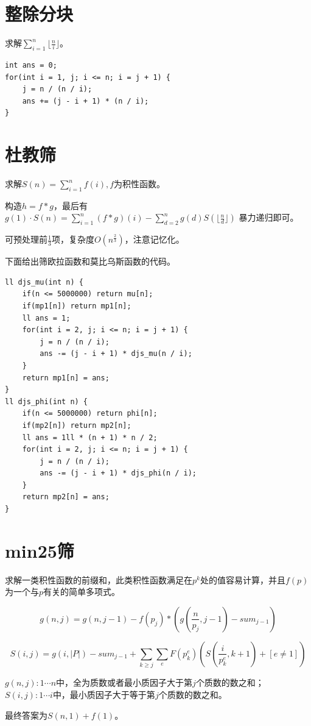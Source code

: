 \documentclass[a4paper,11pt,twoside,fontset = fandol,UTF8]{ctexbook} %
\begin{document}
	\section{整除分块}
	求解$\sum_{i=1}^n\lfloor\frac{n}{i}\rfloor$。
	\begin{lstlisting}
int ans = 0;
for(int i = 1, j; i <= n; i = j + 1) {
    j = n / (n / i);
    ans += (j - i + 1) * (n / i);
}
	\end{lstlisting}
	\section{杜教筛}
	求解$S(n)=\sum_{i=1}^n f(i),f$为积性函数。
	
	构造$h=f*g$，最后有$g(1)\cdot S(n)=\sum_{i=1}^n (f*g)(i)-\sum_{d=2}^n g(d)S(\lfloor\frac{n}{d}\rfloor)$
	暴力递归即可。
	
	可预处理前$\frac{1}{3}$项，复杂度$O(n^\frac{2}{3})$，注意记忆化。
	
	下面给出筛欧拉函数和莫比乌斯函数的代码。
	\begin{lstlisting}
ll djs_mu(int n) {
    if(n <= 5000000) return mu[n];
    if(mp1[n]) return mp1[n];
    ll ans = 1;
    for(int i = 2, j; i <= n; i = j + 1) {
        j = n / (n / i);
        ans -= (j - i + 1) * djs_mu(n / i);
    }
    return mp1[n] = ans;
}
ll djs_phi(int n) {
    if(n <= 5000000) return phi[n];
    if(mp2[n]) return mp2[n];
    ll ans = 1ll * (n + 1) * n / 2;
    for(int i = 2, j; i <= n; i = j + 1) {
        j = n / (n / i);
        ans -= (j - i + 1) * djs_phi(n / i);
    }
    return mp2[n] = ans;
}
	\end{lstlisting}
	\section{min25筛}
	求解一类积性函数的前缀和，此类积性函数满足在$p^k$处的值容易计算，并且$f(p)$为一个与$p$有关的简单多项式。
	
	$$g(n,j)=g(n,j-1)-f(p_j)*(g(\frac{n}{p_j},j-1)-sum_{j-1})$$
	
	$$S(i,j)=g(i,|P|)-sum_{j-1}+\sum_{k\geq j}\sum_{e}F(p_k^e)(S(\frac{i}{p_k^e},k+1)+[e\not ={1}])$$
	
	$g(n,j):1\cdots n$中，全为质数或者最小质因子大于第$j$个质数的数之和；$S(i,j):1\cdots i$中，最小质因子大于等于第$j$个质数的数之和。
	
	最终答案为$S(n,1)+f(1)$。
	
\end{document}
